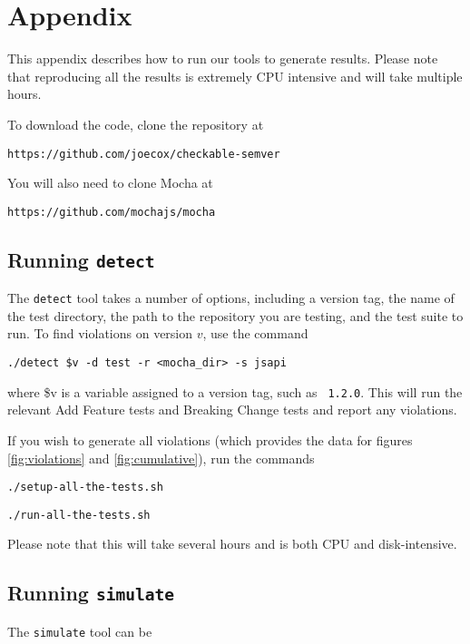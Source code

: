 \section{Appendix}
This appendix describes how to run our tools to generate
results. Please note that reproducing all the results is extremely
CPU intensive and will take multiple hours.

To download the code, clone the repository at
\begin{center}
  {\tt https://github.com/joecox/checkable-semver}
\end{center}

You will also need to clone Mocha at
\begin{center}
  {\tt https://github.com/mochajs/mocha}
\end{center}

\subsection{Running {\large {\tt detect}}}

The {\tt detect} tool takes a number of options, including a version
tag, the name of the test directory, the path to the repository you
are testing, and the test suite to run. To find violations on version
$v$, use the command

\begin{center}
  {\tt ./detect \$v -d test -r <mocha\_dir> -s jsapi}
\end{center}
where \$v is a variable assigned to a version tag, such as {\tt
  1.2.0}. This will run the relevant Add Feature tests and Breaking
Change tests and report any violations.

If you wish to generate all violations (which provides the data for
figures \ref{fig:violations} and \ref{fig:cumulative}), run the
commands

\begin{center}
  {\tt ./setup-all-the-tests.sh}
\end{center}
\begin{center}
  {\tt ./run-all-the-tests.sh}
\end{center}
Please note that this will take several hours and is both CPU and
disk-intensive.

\subsection{Running {\large {\tt simulate}}}

The {\tt simulate} tool can be 

